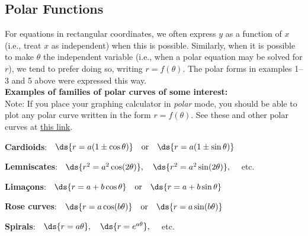 \documentclass[12pt,fleqn]{article}
\def\egsc#1{{\bf Examples #1:}}
\begin{document}
\subsection*{Polar Functions}
For equations in rectangular coordinates, we often express
$y$ as a function of $x$ (i.e., treat $x$ as independent)
when this is possible.
Similarly, when it is possible to make $\theta$ the
independent variable (i.e., when a polar equation may be
solved for $r$), we tend to prefer doing so, writing
$r = f(\theta)$.  The polar forms in examples 1--3 and 5
above were expressed this way.\\[10pt]
\egsc{of families of polar curves of some interest}\\[3pt]
Note: If you place your graphing calculator in {\em polar}
mode, you should be able to plot any polar curve written
in the form $r = f(\theta)$.  See these and other polar
curves at
\href{http://mathdemos.gcsu.edu/mathdemos/family_of_functions/polar_gallery.html}{this link}.
\be
\item {\bf Cardioids}: $\;$
  $\ds{r = a(1 \pm \cos\theta)}
	\quad\mbox{or}\quad
	\ds{r = a(1 \pm \sin\theta)}$
\item {\bf Lemniscates}: $\;$
  $\ds{r^2 = a^2\cos(2\theta)},
  \quad \ds{r^2 = a^2\sin(2\theta)}, \quad$ etc.
\item {\bf Lima\c{c}ons}: $\;$
  $\ds{r = a + b\cos\theta}
	\quad\mbox{or}\quad
	\ds{r = a + b \sin\theta}$
\item {\bf Rose curves}: $\;$
  $\ds{r = a\cos(b\theta)}
	\quad\mbox{or}\quad
	\ds{r = a\sin(b\theta)}$
\item {\bf Spirals}: $\;$
  $\ds{r = a \theta},
  \quad \ds{r = e^{a \theta}}, \quad$ etc.
\ee
\end{document}
